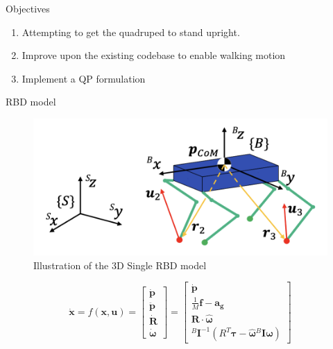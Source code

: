 \documentclass{beamer}
\begin{document}
\begin{frame}{Objectives}
        \begin{enumerate}
            \item{Attempting to get the quadruped to stand upright.}
            \item{Improve upon the existing codebase to enable walking motion}
            \item{Implement a QP formulation}
        \end{enumerate}
\end{frame}\normalfont

\begin{frame}{RBD model}
\begin{figure}
    \centering
    \includegraphics[width=0.6\linewidth]{../Presentation-1/Illustration-RBD-model.png}
    \caption{Illustration of the 3D Single RBD model}
    \label{fig:rbd-model}
\end{figure}
\begin{equation*}
    \mathbf{\dot{x}} = f(\mathbf{x}, \mathbf{u}) = 
    \begin{bmatrix}
    \mathbf{\dot{p}} \\
    \mathbf{\ddot{p}} \\
    \mathbf{\dot{R}} \\
    \boldsymbol{\dot{\omega}}
    \end{bmatrix}
    =
    \begin{bmatrix}
    \mathbf{\dot{p}} \\
    \frac{1}{M} \mathbf{f} - \mathbf{a_g} \\
    \mathbf{R} \cdot \hat{\boldsymbol{\omega}} \\
    {}^{B} \mathbf{I}^{-1}(R^T \boldsymbol{\tau} - \hat{\boldsymbol{\omega}} {}^{B} \mathbf{I} \boldsymbol{\omega})
    \end{bmatrix}
\end{equation*}
\end{frame}
\end{document}
